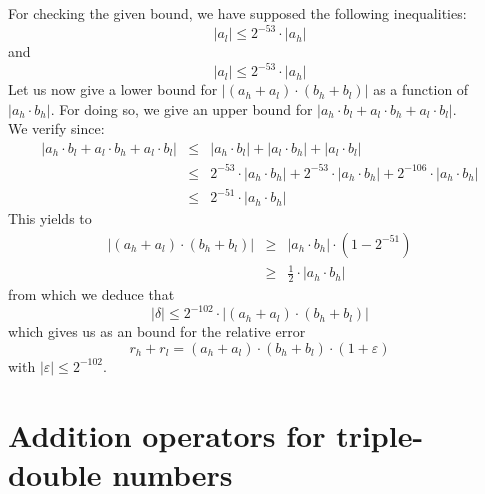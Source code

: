 \documentclass[a4paper,10pt,twoside]{article}
\newenvironment{proof}[1][Proof]{\begin{trivlist}
\item[\hskip \labelsep {\bfseries #1}]}{\end{trivlist}}
\newcommand{\qed}{\nobreak \ifvmode \relax \else \ifdim \lastskip<1.5em \hskip-\lastskip
\hskip1.5em plus0em minus0.5em \fi \nobreak \vrule height0.75em width0.5em depth0.25em\fi}
\newcommand{\hi}{\ensuremath{\mathit{h}}}
\newcommand{\lo}{\ensuremath{\mathit{l}}}
\renewcommand{\epsilon}{\varepsilon}
\begin{document}
\begin{proof}
For checking the given bound, we have supposed the following inequalities:
$$\left \vert a_\lo \right \vert \leq 2^{-53} \cdot \left \vert a_\hi \right \vert$$
and
$$\left \vert a_\lo \right \vert \leq 2^{-53} \cdot \left \vert a_\hi \right \vert$$
Let us now give a lower bound for
$\left \vert \left( a_\hi + a_\lo \right) \cdot \left( b_\hi + b_\lo
  \right)\right \vert$ as a function of
$\left \vert a_\hi \cdot b_\hi \right \vert$. For doing so, we give an upper
bound for
$\left \vert a_\hi \cdot b_\lo + a_\lo \cdot b_\hi + a_\lo \cdot b_\lo \right \vert$. \\
We verify since:
\begin{eqnarray*}
\left \vert a_\hi \cdot b_\lo + a_\lo \cdot b_\hi + a_\lo \cdot b_\lo \right \vert & \leq &
\left \vert a_\hi \cdot b_\lo \right \vert + \left \vert a_\lo \cdot b_\hi \right \vert + \left \vert a_\lo \cdot b_\lo \right \vert \\
& \leq & 2^{-53} \cdot \left \vert a_\hi \cdot b_\hi \right \vert + 2^{-53} \cdot \left \vert a_\hi \cdot b_\hi \right \vert +
2^{-106} \cdot \left \vert a_\hi \cdot b_\hi \right \vert \\
& \leq & 2^{-51} \cdot \left \vert a_\hi \cdot b_\hi \right \vert
\end{eqnarray*}
This yields to
\begin{eqnarray*}
\left \vert \left( a_\hi + a_\lo \right) \cdot \left( b_\hi + b_\lo \right) \right \vert & \geq &
\left \vert a_\hi \cdot b_\hi \right \vert \cdot \left(1 - 2^{-51} \right) \\
& \geq & \frac{1}{2} \cdot \left \vert a_\hi \cdot b_\hi \right \vert
\end{eqnarray*}
from which we deduce that
$$\left \vert \delta \right \vert \leq 2^{-102} \cdot \left \vert \left( a_\hi + a_\lo \right) \cdot \left( b_\hi + b_\lo \right) \right \vert$$
which gives us as an bound for the relative error
$$r_\hi + r_\lo = \left( a_\hi + a_\lo \right) \cdot \left( b_\hi + b_\lo \right) \cdot \left(1 + \epsilon \right)$$
with
$\left \vert \epsilon \right \vert \leq 2^{-102}$. \qed
\end{proof}
\section{Addition operators for triple-double numbers}
\end{document}
